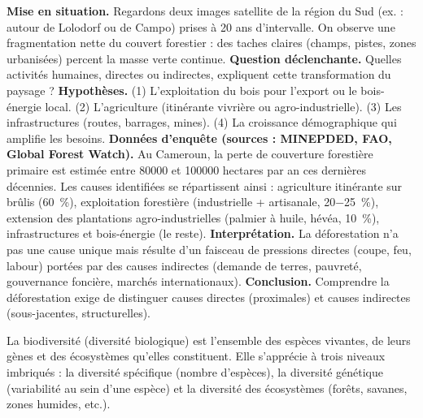 \documentclass[11pt]{article}
\newcommand{\cle}[1]{{\popxbold\color{popdark}#1}}
\begin{document}
\begin{experience}
\textbf{Mise en situation.} Regardons deux images satellite de la région du Sud (ex. : autour de Lolodorf ou de Campo) prises à 20 ans d'intervalle. On observe une fragmentation nette du couvert forestier : des taches claires (champs, pistes, zones urbanisées) percent la masse verte continue.
\textbf{Question déclenchante.} Quelles activités humaines, directes ou indirectes, expliquent cette transformation du paysage ?
\textbf{Hypothèses.} (1) L'exploitation du bois pour l'export ou le bois-énergie local. (2) L'agriculture (itinérante vivrière ou agro-industrielle). (3) Les infrastructures (routes, barrages, mines). (4) La croissance démographique qui amplifie les besoins.
\textbf{Données d'enquête (sources : MINEPDED, FAO, Global Forest Watch).} Au Cameroun, la perte de couverture forestière primaire est estimée entre \num{80000} et \num{100000} hectares par an ces dernières décennies. Les causes identifiées se répartissent ainsi : agriculture itinérante sur brûlis (\approx \SI{60}{\%}), exploitation forestière (industrielle + artisanale, \approx \SI{20-25}{\%}), extension des plantations agro-industrielles (palmier à huile, hévéa, \approx \SI{10}{\%}), infrastructures et bois-énergie (le reste).
\textbf{Interprétation.} La déforestation n'a pas une cause unique mais résulte d'un faisceau de pressions directes (coupe, feu, labour) portées par des causes indirectes (demande de terres, pauvreté, gouvernance foncière, marchés internationaux).
\textbf{Conclusion.} Comprendre la déforestation exige de distinguer \cle{causes directes} (proximales) et \cle{causes indirectes} (sous-jacentes, structurelles).
\end{experience}

\begin{definition}[Biodiversité]
La \cle{biodiversité} (diversité biologique) est l'ensemble des espèces vivantes, de leurs gènes et des écosystèmes qu'elles constituent. Elle s'apprécie à trois niveaux imbriqués : la diversité spécifique (nombre d'espèces), la diversité génétique (variabilité au sein d'une espèce) et la diversité des écosystèmes (forêts, savanes, zones humides, etc.).
\end{definition}
\end{document}
